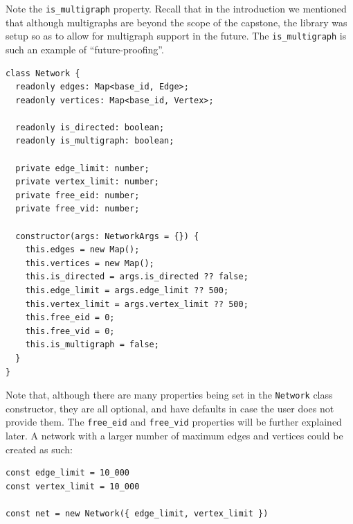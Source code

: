 Note the \texttt{is_multigraph} property.
Recall that in the introduction we mentioned that although multigraphs
are beyond the scope of the capstone, the library was setup so
as to allow for multigraph support in the future.
The \texttt{is_multigraph} is such an example of ``future-proofing''.

\begin{verbatim}
class Network {
  readonly edges: Map<base_id, Edge>;
  readonly vertices: Map<base_id, Vertex>;

  readonly is_directed: boolean;
  readonly is_multigraph: boolean;

  private edge_limit: number;
  private vertex_limit: number;
  private free_eid: number;
  private free_vid: number;

  constructor(args: NetworkArgs = {}) {
    this.edges = new Map();
    this.vertices = new Map();
    this.is_directed = args.is_directed ?? false;
    this.edge_limit = args.edge_limit ?? 500;
    this.vertex_limit = args.vertex_limit ?? 500;
    this.free_eid = 0;
    this.free_vid = 0;
    this.is_multigraph = false;
  }
}
\end{verbatim}

Note that, although there are many properties being set 
in the \texttt{Network} class constructor,
they are all optional, and have defaults in case the user does not provide them.
The \texttt{free_eid} and \texttt{free_vid} properties will be further explained later.
A network with a larger number of maximum edges and vertices could be created as such:

\begin{verbatim}
const edge_limit = 10_000
const vertex_limit = 10_000

const net = new Network({ edge_limit, vertex_limit })
\end{verbatim}